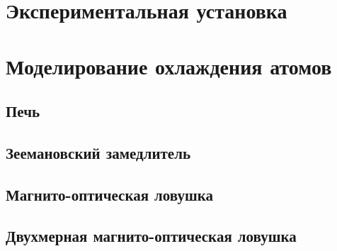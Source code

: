 \unewpage
\section{Экспериментальная установка}








\unewpage
\section{Моделирование охлаждения атомов}


\subsection{Печь}



\unewpage
\subsection{Зеемановский замедлитель} 



% 


\unewpage
\subsection{Магнито-оптическая ловушка} \label{subsec:мол}




\unewpage
\subsection{Двухмерная магнито-оптическая ловушка} 











\unewpage
